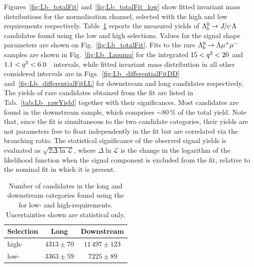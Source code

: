 %
Figures~\ref{fig:Lb_totalFit} and~\ref{fig:Lb_totalFit_low} show fitted invariant mass distributions for
the normalisation channel, selected with the high \qsq and low \qsq requirements respectively.
Table~\ref{tab:Lb_rawYieldJpsi} reports the measured yields of $\Lb\ra\jpsi\Lz$ candidates found using the low 
and high \qsq selections. Values for the signal shape parameters are shown on Fig.~\ref{fig:Lb_totalFit}.
Fits to the rare $\Lambda^0_b\rightarrow\Lambda\mu^+\mu^-$ samples are shown in Fig.~\ref{fig:Lb_Lmumu} for the integrated
$15 < q^2 < 20$ and $1.1 < q^2 < 6.0$~\gevgevcccc ~\qsq intervals, while
fitted invariant mass distribution in all other considered \qsq intervals are in Figs.~\ref{fig:Lb_differentialFitDD}
and~\ref{fig:Lb_differentialFitLL} for downstream and long candidates respectively.
The yields of rare candidates obtained from the fit are listed in Tab.~\ref{tab:Lb_rawYield} together with their significances.
Most candidates are found in the downstream sample, which comprises $\sim 80\,\%$ of the total yield.
Note that, since the fit is simultaneous to the two candidate categories, their yields
are not parameters free to float independently in the fit but are correlated via the branching ratio.
The statistical significance of the observed signal yields is evaluated as $\sqrt{2\Delta\ln{\mathcal{L}}}$, where
$\Delta\ln{\mathcal{L}}$ is the change in the logarithm of the likelihood function when the signal component
is excluded from the fit, relative to the nominal fit in which it is present.

\begin{table}
\centering
\caption{Number of \decay{\Lb}{\jpsi\Lz} candidates in the long and
  downstream categories found using the for low- and
  high-\qsq requirements. Uncertainties shown are statistical only.}
\begin{tabular}{lcc}
Selection & Long & Downstream					\\ \hline
high-\qsq	& $4313 \pm 70$	 	&  $11\,497 \pm 123$ \\
low-\qsq	& $3363 \pm 59$ 	&  $\phantom{0}\,7225 \pm 89\phantom{0}$  \\
 \hline
\end{tabular}
\label{tab:Lb_rawYieldJpsi}
\end{table}



